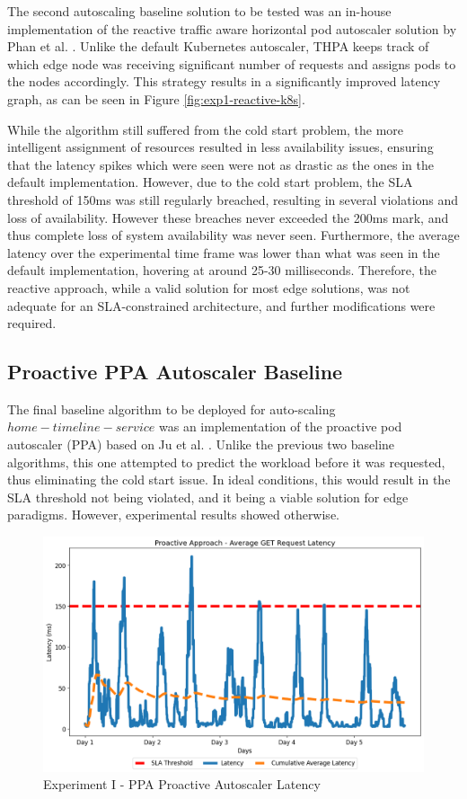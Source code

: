 The second autoscaling baseline solution to be tested was an in-house implementation of the reactive traffic aware horizontal pod autoscaler solution by Phan et al. \cite{phan2022traffic}. Unlike the default Kubernetes autoscaler, THPA keeps track of which edge node was receiving significant number of requests and assigns pods to the nodes accordingly. This strategy results in a significantly improved latency graph, as can be seen in Figure \ref{fig:exp1-reactive-k8s}.\par

While the algorithm still suffered from the cold start problem, the more intelligent assignment of resources resulted in less availability issues, ensuring that the latency spikes which were seen were not as drastic as the ones in the default implementation. However, due to the cold start problem, the SLA threshold of 150ms was still regularly breached, resulting in several violations and loss of availability. However these breaches never exceeded the 200ms mark, and thus complete loss of system availability was never seen. Furthermore, the average latency over the experimental time frame was lower than what was seen in the default implementation, hovering at around 25-30 milliseconds. Therefore, the reactive approach, while a valid solution for most edge solutions, was not adequate for an SLA-constrained architecture, and further modifications were required.\par

\subsection {Proactive PPA Autoscaler Baseline}
\label{subsec:ch5-exp1-proactive-algo}

The final baseline algorithm to be deployed for auto-scaling $home-timeline-service$ was an implementation of the proactive pod autoscaler (PPA) based on Ju et al. \cite{ju2021proactive}. Unlike the previous two baseline algorithms, this one attempted to predict the workload before it was requested, thus eliminating the cold start issue. In ideal conditions, this would result in the SLA threshold not being violated, and it being a viable solution for edge paradigms. However, experimental results showed otherwise.\par

\begin{figure}[htb]
    \centering
    \caption{Experiment I - PPA Proactive Autoscaler Latency}
    \label{fig:exp1-proactive-k8s}
    \includegraphics[width=0.6\linewidth]{Figures/Home-Timeline-Proactive-Latency.png}
\end{figure}

